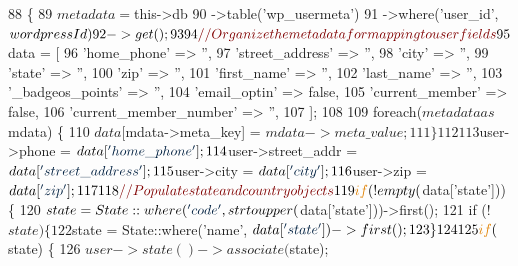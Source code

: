 \begin{DoxyCode}
88     \{
89         $metadata = $this->db
90             ->table(\textcolor{stringliteral}{'wp\_usermeta'})
91             ->where(\textcolor{stringliteral}{'user\_id'}, $wordpressId)
92             ->get();
93 
94         \textcolor{comment}{// Organize the metadata for mapping to user fields}
95         $data = [
96             \textcolor{stringliteral}{'home\_phone'}            => \textcolor{stringliteral}{''},
97             \textcolor{stringliteral}{'street\_address'}        => \textcolor{stringliteral}{''},
98             \textcolor{stringliteral}{'city'}                  => \textcolor{stringliteral}{''},
99             \textcolor{stringliteral}{'state'}                 => \textcolor{stringliteral}{''},
100             \textcolor{stringliteral}{'zip'}                   => \textcolor{stringliteral}{''},
101             \textcolor{stringliteral}{'first\_name'}            => \textcolor{stringliteral}{''},
102             \textcolor{stringliteral}{'last\_name'}             => \textcolor{stringliteral}{''},
103             \textcolor{stringliteral}{'\_badgeos\_points'}       => \textcolor{stringliteral}{''},
104             \textcolor{stringliteral}{'email\_optin'}           => \textcolor{keyword}{false},
105             \textcolor{stringliteral}{'current\_member'}        => \textcolor{keyword}{false},
106             \textcolor{stringliteral}{'current\_member\_number'} => \textcolor{stringliteral}{''},
107         ];
108 
109         \textcolor{keywordflow}{foreach}($metadata as $mdata) \{
110             $data[$mdata->meta\_key] = $mdata->meta\_value;
111         \}
112 
113         $user->phone            = $data[\textcolor{stringliteral}{'home\_phone'}];
114         $user->street\_addr      = $data[\textcolor{stringliteral}{'street\_address'}];
115         $user->city             = $data[\textcolor{stringliteral}{'city'}];
116         $user->zip              = $data[\textcolor{stringliteral}{'zip'}];
117 
118         \textcolor{comment}{// Populate state and country objects}
119         \textcolor{keywordflow}{if} (!empty($data[\textcolor{stringliteral}{'state'}])) \{
120             $state = State::where(\textcolor{stringliteral}{'code'}, strtoupper($data[\textcolor{stringliteral}{'state'}]))->first();
121             \textcolor{keywordflow}{if} (!$state) \{
122                 $state = State::where(\textcolor{stringliteral}{'name'}, $data[\textcolor{stringliteral}{'state'}])->first();
123             \}
124 
125             \textcolor{keywordflow}{if} ($state) \{
126                 $user->state()->associate($state);

\end{DoxyCode}
